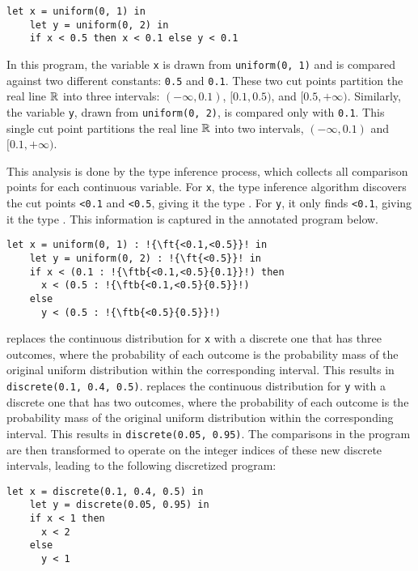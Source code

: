 \begin{lstlisting}[aboveskip=1em,belowskip=1em]
    let x = uniform(0, 1) in
    let y = uniform(0, 2) in
    if x < 0.5 then x < 0.1 else y < 0.1
\end{lstlisting}

\noindent In this program, the variable \texttt{x} is drawn from \texttt{uniform(0, 1)} and is compared against two different constants: \texttt{0.5} and \texttt{0.1}. These two cut points partition the real line $\mathbb{R}$ into three intervals: $(-\infty, 0.1)$, $[0.1, 0.5)$, and $[0.5, +\infty)$. Similarly, the variable \texttt{y}, drawn from \texttt{uniform(0, 2)}, is compared only with \texttt{0.1}. This single cut point partitions the real line $\mathbb{R}$ into two intervals, $(-\infty, 0.1)$ and $[0.1, +\infty)$.


This analysis is done by the type inference process, which collects all comparison points for each continuous variable. For \texttt{x}, the type inference algorithm discovers the cut points \texttt{<0.1} and \texttt{<0.5}, giving it the type . For \texttt{y}, it only finds \texttt{<0.1}, giving it the type . This information is captured in the annotated program below.

\begin{lstlisting}[aboveskip=1em,belowskip=1em,escapechar=!]
    let x = uniform(0, 1) : !{\ft{<0.1,<0.5}}! in
    let y = uniform(0, 2) : !{\ft{<0.5}}! in
    if x < (0.1 : !{\ftb{<0.1,<0.5}{0.1}}!) then
      x < (0.5 : !{\ftb{<0.1,<0.5}{0.5}}!)
    else
      y < (0.5 : !{\ftb{<0.5}{0.5}}!)
\end{lstlisting}


\Slice{} replaces the continuous distribution for \texttt{x} with a discrete one that has three outcomes, where the probability of each outcome is the probability mass of the original uniform distribution within the corresponding interval. This results in \texttt{discrete(0.1, 0.4, 0.5)}.
\Slice{} replaces the continuous distribution for \texttt{y} with a discrete one that has two outcomes, where the probability of each outcome is the probability mass of the original uniform distribution within the corresponding interval. This results in \texttt{discrete(0.05, 0.95)}. The comparisons in the program are then transformed to operate on the integer indices of these new discrete intervals, leading to the following discretized program:

\begin{lstlisting}[aboveskip=1em,belowskip=1em]
    let x = discrete(0.1, 0.4, 0.5) in
    let y = discrete(0.05, 0.95) in
    if x < 1 then
      x < 2
    else
      y < 1
\end{lstlisting}

